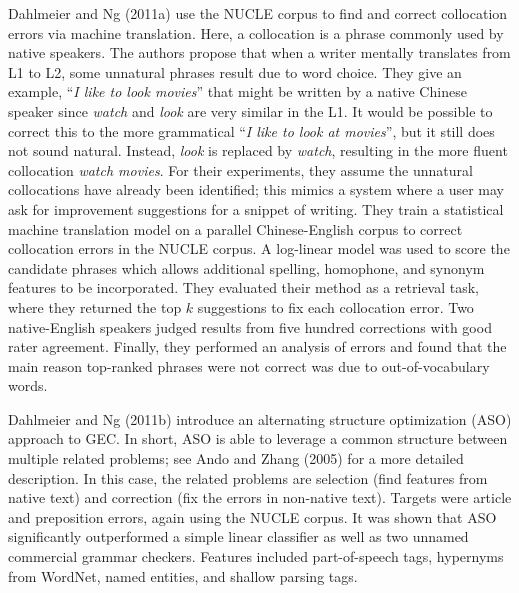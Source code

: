 Dahlmeier and Ng (2011a) use the NUCLE corpus to find and correct collocation errors via
machine translation. Here, a collocation is a phrase commonly used by native
speakers. The authors propose that when a writer mentally translates from L1 to
L2, some unnatural phrases result due to word choice. They give an example,
``\emph{I like to look movies}'' that might be written by a native Chinese
speaker since \emph{watch} and \emph{look} are very similar in the L1. It would
be possible to correct this to the more grammatical ``\emph{I like to look at
movies}'', but it still does not sound natural. Instead, \emph{look} is replaced
by \emph{watch}, resulting in the more fluent collocation \emph{watch movies}.
For their experiments, they assume the unnatural collocations have already been
identified; this mimics a system where a user may ask for improvement
suggestions for a snippet of writing. They train a statistical machine
translation model on a parallel Chinese-English corpus to correct collocation
errors in the NUCLE corpus. A log-linear model was used to score the candidate
phrases which allows additional spelling, homophone, and synonym features to be
incorporated. They evaluated their method as a retrieval task, where they
returned the top $k$ suggestions to fix each collocation error. Two
native-English speakers judged results from five hundred corrections with good
rater agreement. Finally, they performed an analysis of errors and found that
the main reason top-ranked phrases were not correct was due to out-of-vocabulary
words.

Dahlmeier and Ng (2011b) introduce an alternating structure optimization (ASO)
approach to GEC\@. In short, ASO is able to leverage a
common structure between multiple related problems; see Ando and Zhang (2005) for a more
detailed description. In this case, the related problems are selection (find
features from native text) and correction (fix the errors in non-native text).
Targets were article and preposition errors, again using the NUCLE corpus.
It was shown that ASO significantly outperformed a simple linear classifier as
well as two unnamed commercial grammar checkers. Features included
part-of-speech tags, hypernyms from WordNet, named entities, and shallow parsing
tags.


